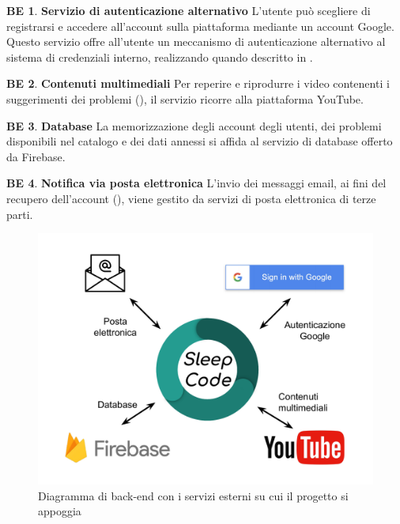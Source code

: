 \documentclass[11pt, a4paper]{article}
\theoremstyle{definition}
\newtheorem{backend}{BE}
\begin{document}
\begin{backend}
\textbf{Servizio di autenticazione alternativo }
L'utente può scegliere di registrarsi e accedere all'account sulla piattaforma
mediante un account Google. Questo servizio offre all'utente un meccanismo di
autenticazione alternativo al sistema di credenziali interno, realizzando quando
descritto in \textcolor{blue}{}.
\end{backend}

\begin{backend}
\textbf{Contenuti multimediali }
Per reperire e riprodurre i video contenenti i suggerimenti dei problemi (\textcolor{blue}{}),
il servizio ricorre alla piattaforma YouTube.
\end{backend}

\begin{backend}
\textbf{Database }
La memorizzazione degli account degli utenti, dei problemi disponibili
nel catalogo e dei dati annessi si affida al servizio di database offerto
da Firebase.
\end{backend}

\begin{backend}
\textbf{Notifica via posta elettronica }
L'invio dei messaggi email, ai fini del recupero dell'account (\textcolor{blue}{}), viene gestito da servizi di posta elettronica di terze parti.
\end{backend}

\begin{figure}[H]
\centering
\includegraphics[scale=0.45]{materiale/backend.pdf}
\caption{Diagramma di back-end con i servizi esterni su cui il progetto si appoggia}
\label{backend}
\end{figure}
\end{document}
